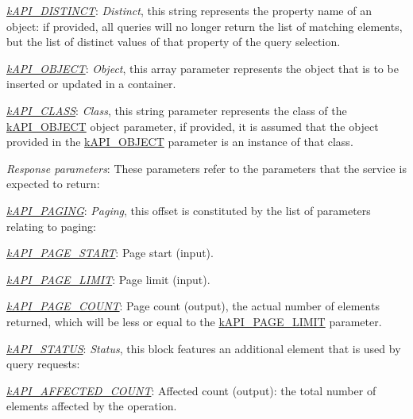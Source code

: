 \begin{DoxyItemize}
\begin{DoxyItemize}
\item {\itshape \hyperlink{}{k\-A\-P\-I\-\_\-\-D\-I\-S\-T\-I\-N\-C\-T}}\-: {\itshape Distinct}, this string represents the property name of an object\-: if provided, all queries will no longer return the list of matching elements, but the list of distinct values of that property of the query selection. 
\item {\itshape \hyperlink{}{k\-A\-P\-I\-\_\-\-O\-B\-J\-E\-C\-T}}\-: {\itshape Object}, this array parameter represents the object that is to be inserted or updated in a container. 
\item {\itshape \hyperlink{}{k\-A\-P\-I\-\_\-\-C\-L\-A\-S\-S}}\-: {\itshape Class}, this string parameter represents the class of the \hyperlink{}{k\-A\-P\-I\-\_\-\-O\-B\-J\-E\-C\-T} object parameter, if provided, it is assumed that the object provided in the \hyperlink{}{k\-A\-P\-I\-\_\-\-O\-B\-J\-E\-C\-T} parameter is an instance of that class. 
\end{DoxyItemize}
\item {\itshape Response parameters}\-: These parameters refer to the parameters that the service is expected to return\-: 
\begin{DoxyItemize}
\item {\itshape \hyperlink{}{k\-A\-P\-I\-\_\-\-P\-A\-G\-I\-N\-G}}\-: {\itshape Paging}, this offset is constituted by the list of parameters relating to paging\-: 
\begin{DoxyItemize}
\item {\itshape \hyperlink{}{k\-A\-P\-I\-\_\-\-P\-A\-G\-E\-\_\-\-S\-T\-A\-R\-T}}\-: Page start (input). 
\item {\itshape \hyperlink{}{k\-A\-P\-I\-\_\-\-P\-A\-G\-E\-\_\-\-L\-I\-M\-I\-T}}\-: Page limit (input). 
\item {\itshape \hyperlink{}{k\-A\-P\-I\-\_\-\-P\-A\-G\-E\-\_\-\-C\-O\-U\-N\-T}}\-: Page count (output), the actual number of elements returned, which will be less or equal to the \hyperlink{}{k\-A\-P\-I\-\_\-\-P\-A\-G\-E\-\_\-\-L\-I\-M\-I\-T} parameter. 
\end{DoxyItemize}
\item {\itshape \hyperlink{}{k\-A\-P\-I\-\_\-\-S\-T\-A\-T\-U\-S}}\-: {\itshape Status}, this block features an additional element that is used by query requests\-: 
\begin{DoxyItemize}
\item {\itshape \hyperlink{}{k\-A\-P\-I\-\_\-\-A\-F\-F\-E\-C\-T\-E\-D\-\_\-\-C\-O\-U\-N\-T}}\-: Affected count (output)\-: the total number of elements affected by the operation. 

\end{DoxyItemize}
\end{DoxyItemize}
\end{DoxyItemize}

